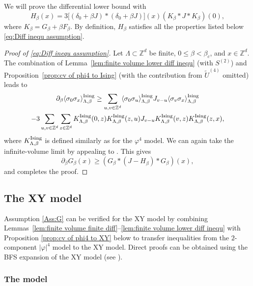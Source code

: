 \documentclass[11pt,a4paper]{article}
\numberwithin{equation}{section}
\theoremstyle{plain}
\theoremstyle{definition}
\newcommand\1{\mathds{1}}
\begin{document}
We will prove the differential lower bound with
\begin{equation}
\label{eq:HIsing}
	H_\beta(x)=3\big[ (\delta_0+\beta J)*(\delta_0+\beta J)\big] (x)(K_\beta*J*K_\beta)(0),
\end{equation}
where $K_\beta=G_\beta+\beta F_\beta$.
By definition, $H_\beta$ satisfies all the properties listed below \eqref{eq:Diff inequ assumption}.

\begin{proof}[Proof of \eqref{eq:Diff inequ assumption}] Let $\Lambda\subset \mathbb Z^d$ be finite, $0\leq \beta<\beta_c$, and $x\in \mathbb Z^d$.
The combination of Lemma~\ref{lem:finite volume lower diff inequ}
(with $S^{(2)}$) and Proposition~\ref{prop:cv of phi4 to Ising}
(with the contribution from $\tilde U^{(4)}$ omitted) leads to
\begin{multline}
	\partial_\beta\langle \sigma_0\sigma_x\rangle_{\Lambda,\beta}^{\rm Ising}\geq \sum_{u,v\in \mathbb Z^d}\langle \sigma_0\sigma_u\rangle_{\Lambda,\beta}^{\rm Ising}J_{v-u}\langle \sigma_v\sigma_x\rangle_{\Lambda,\beta}^{\rm Ising}
	\\
- 3
\sum_{u,v\in \mathbb Z^d}
\sum_{z\in \mathbb Z^d} K_{\Lambda,\beta}^{\rm Ising}(0,z)K_{\Lambda,\beta}^{\rm Ising}(z,u)J_{v-u}K_{\Lambda,\beta}^{\rm Ising}(v,z)K_{\Lambda,\beta}^{\rm Ising}(z,x),
\end{multline}
where $K^{\rm Ising}_{\Lambda,\beta}$ is defined similarly as for the  $\varphi^4$ model.
We can again take the infinite-volume limit by appealing to \cite{Lebo72}.
This gives
\begin{equation}
	\partial_\beta G_\beta(x)\geq (G_\beta*(J-H^{}_\beta)*G_\beta)(x),
\end{equation}
and completes the proof.
\end{proof}



\subsection{The XY model}
\label{sec:XY}

Assumption \ref{Ass:G} can be verified for the XY model by combining Lemmas~\ref{lem:finite volume finite diff}--\ref{lem:finite volume lower diff inequ} with Proposition \ref{prop:cv of phi4 to XY} below to transfer inequalities from the $2$-component $|\varphi|^4$ model to the XY model.
Direct proofs can be obtained using the BFS expansion of the XY model (see \cite{Lamm23}).


\subsubsection{The model}
\end{document}
